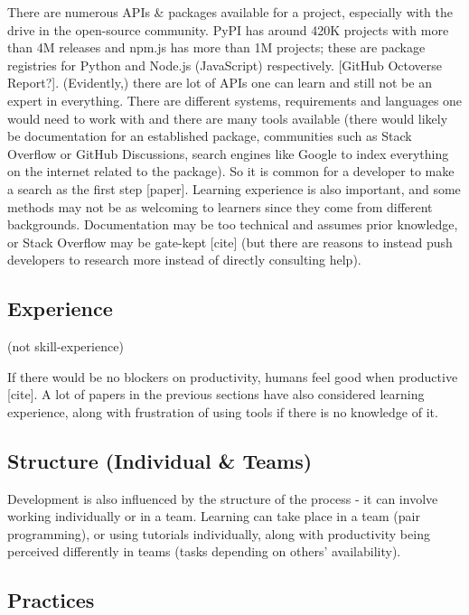 \documentclass{mprop}
\begin{document}
There are numerous APIs \& packages available for a project, especially with the drive in the open-source community. PyPI has around 420K projects with more than 4M releases and npm.js has more than 1M projects; these are package registries for Python and Node.js (JavaScript) respectively. [GitHub Octoverse Report?]. (Evidently,) there are lot of APIs one can learn and still not be an expert in everything. There are different systems, requirements and languages one would need to work with and there are many tools available (there would likely be documentation for an established package, communities such as Stack Overflow or GitHub Discussions, search engines like Google to index everything on the internet related to the package). So it is common for a developer to make a search as the first step [paper]. Learning experience is also important, and some methods may not be as welcoming to learners since they come from different backgrounds. Documentation may be too technical and assumes prior knowledge, or Stack Overflow may be gate-kept [cite] (but there are reasons to instead push developers to research more instead of directly consulting help).

\subsection{Experience}%

(not skill-experience)

If there would be no blockers on productivity, humans feel good when productive [cite]. A lot of papers in the previous sections have also considered learning experience, along with frustration of using tools if there is no knowledge of it.

\subsection{Structure (Individual \& Teams)}

Development is also influenced by the structure of the process - it can involve working individually or in a team. Learning can take place in a team (pair programming), or using tutorials individually, along with productivity being perceived differently in teams (tasks depending on others' availability).

\subsection{Practices}%
\end{document}
